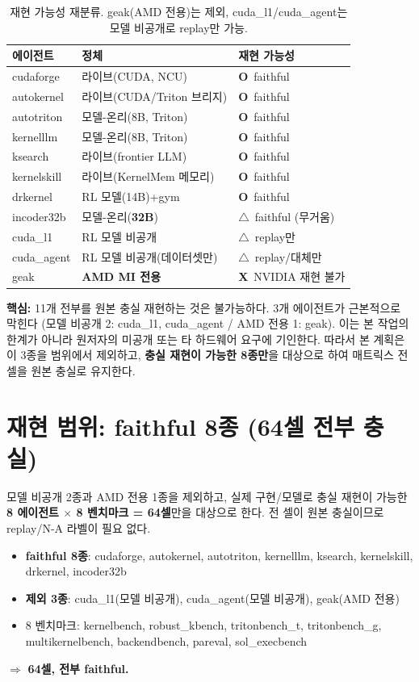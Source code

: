 \documentclass[11pt]{article}
\newcommand{\yes}{\textcolor{green!55!black}{\textbf{O}}}
\newcommand{\no}{\textcolor{red!70!black}{\textbf{X}}}
\newcommand{\warn}{\textcolor{orange!85!black}{\textbf{$\triangle$}}}
\begin{document}
\begin{table}[h]
\centering
\begin{tabular}{@{}lll@{}}
\toprule
\textbf{에이전트} & \textbf{정체} & \textbf{재현 가능성} \\
\midrule
cudaforge   & 라이브(CUDA, NCU)        & \yes\ faithful \\
autokernel  & 라이브(CUDA/Triton 브리지) & \yes\ faithful \\
autotriton  & 모델-온리(8B, Triton)     & \yes\ faithful \\
kernelllm   & 모델-온리(8B, Triton)     & \yes\ faithful \\
ksearch     & 라이브(frontier LLM)      & \yes\ faithful \\
kernelskill & 라이브(KernelMem 메모리)   & \yes\ faithful \\
drkernel    & RL 모델(14B)+gym          & \yes\ faithful \\
incoder32b  & 모델-온리(\textbf{32B})    & \warn\ faithful (무거움) \\
cuda\_l1    & RL 모델 비공개            & \warn\ replay만 \\
cuda\_agent & RL 모델 비공개(데이터셋만)  & \warn\ replay/대체만 \\
geak        & \textbf{AMD MI 전용}      & \no\ NVIDIA 재현 불가 \\
\bottomrule
\end{tabular}
\caption{재현 가능성 재분류. geak(AMD 전용)는 제외, cuda\_l1/cuda\_agent는 모델 비공개로 replay만 가능.}
\end{table}

\noindent\textbf{핵심:} 11개 전부를 원본 충실 재현하는 것은 불가능하다. 3개 에이전트가 근본적으로 막힌다
(모델 비공개 2: cuda\_l1, cuda\_agent / AMD 전용 1: geak). 이는 본 작업의 한계가 아니라
원저자의 미공개 또는 타 하드웨어 요구에 기인한다. 따라서 본 계획은 이 3종을 범위에서 제외하고,
\textbf{충실 재현이 가능한 8종만}을 대상으로 하여 매트릭스 전 셀을 원본 충실로 유지한다.

\section{재현 범위: faithful 8종 (64셀 전부 충실)}
모델 비공개 2종과 AMD 전용 1종을 제외하고, 실제 구현/모델로 충실 재현이 가능한
\textbf{8 에이전트 $\times$ 8 벤치마크 = 64셀}만을 대상으로 한다. 전 셀이 원본 충실이므로
replay/N-A 라벨이 필요 없다.
\begin{itemize}
  \item \textbf{faithful 8종}: cudaforge, autokernel, autotriton, kernelllm, ksearch, kernelskill, drkernel, incoder32b
  \item \textbf{제외 3종}: cuda\_l1(모델 비공개), cuda\_agent(모델 비공개), geak(AMD 전용)
  \item 8 벤치마크: kernelbench, robust\_kbench, tritonbench\_t, tritonbench\_g, multikernelbench, backendbench, pareval, sol\_execbench
\end{itemize}
$\Rightarrow$ \textbf{64셀, 전부 faithful.}
\end{document}
